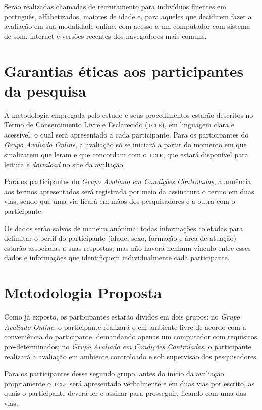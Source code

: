 \documentclass[a4paper,11pt,titlepage,singlespacing]{article}
\begin{document}
\noindent Serão realizadas chamadas de recrutamento para indivíduos fluentes em português, alfabetizados, maiores de idade e, para aqueles que decidirem fazer a avaliação em sua modalidade online, com acesso a um computador com sistema de som, internet e versões recentes dos navegadores mais comuns.

\section{Garantias éticas aos participantes da pesquisa}
\noindent A metodologia empregada pelo estudo e seus procedimentos estarão descritos no Termo de Consentimento Livre e Esclarecido (\textsc{tcle}), em linguagem clara e acessível, o qual será apresentado a cada participante. Para os participantes do \textit{Grupo Avaliado Online}, a avaliação só se iniciará a partir do momento em que sinalizarem que leram e que concordam com o \textsc{tcle}, que estará disponível para leitura e \textit{download} no site da avaliação. 

Para os participantes do \textit{Grupo Avaliado em Condições Controladas}, a anuência aos termos apresentados será registrada por meio da assinatura o termo em duas vias, sendo que uma via ficará em mãos dos pesquisadores e a outra com o participante.

Os dados serão salvos de maneira anônima: todas informações coletadas para delimitar o perfil do participante (idade, sexo, formação e área de atuação) estarão associadas a suas respostas, mas não haverá nenhum vínculo entre esses dados e informações que identifiquem individualmente cada participante.



\section{Metodologia Proposta}

\noindent Como já exposto, os participantes estarão dividos em dois grupos: no \textit{Grupo Avaliado Online}, o participante realizará o em ambiente livre de acordo com a conveniência do participante, demandando apenas um computador com requisitos pré-determinados; no \textit{Grupo Avaliado em Condições Controladas}, o participante realizará a avaliação em ambiente controloado e sob supervisão dos pesquisadores.

Para os participantes desse segundo grupo, antes do início da avaliação propriamente o \textsc{tcle} será apresentado verbalmente e em duas vias por escrito, as quais o participante deverá ler e assinar para prosseguir, ficando com uma das vias.
\end{document}
